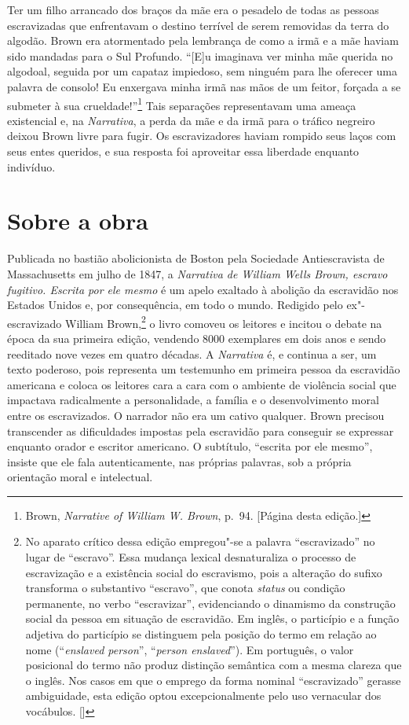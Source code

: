Ter um filho arrancado dos braços da mãe era o pesadelo de todas as
pessoas escravizadas que enfrentavam o destino terrível de serem
removidas da terra do algodão. Brown era atormentado pela lembrança de
como a irmã e a mãe haviam sido mandadas para o Sul Profundo. ``{[}E{]}u
imaginava ver minha mãe querida no algodoal, seguida por um capataz
impiedoso, sem ninguém para lhe oferecer uma palavra de consolo! Eu
enxergava minha irmã nas mãos de um feitor, forçada a se submeter à sua
crueldade!''\footnote{Brown, \emph{Narrative of William W. Brown}, p.~94.
  {[}Página \pageref{ref10} desta edição.{]}} Tais separações representavam uma
ameaça existencial e, na \emph{Narrativa}, a perda da mãe e da irmã para
o tráfico negreiro deixou Brown livre para fugir. Os escravizadores
haviam rompido seus laços com seus entes queridos, e sua resposta foi
aproveitar essa liberdade enquanto indivíduo.


\section{Sobre a obra}

Publicada no bastião abolicionista de Boston
pela Sociedade Antiescravista de Massachusetts em julho de 1847, a
\emph{Narrativa de William Wells Brown, escravo fugitivo. Escrita
por ele mesmo} é um apelo exaltado à abolição da escravidão nos Estados
Unidos e, por consequência, em todo o mundo. Redigido pelo ex"-escravizado
William Brown,\footnote{No aparato crítico dessa edição empregou"-se a palavra ``escravizado'' no lugar de ``escravo''. Essa mudança lexical desnaturaliza o processo de escravização e a existência social do escravismo, pois a alteração do sufixo transforma o substantivo ``escravo'', que conota \emph{status} ou condição permanente, no verbo ``escravizar'', evidenciando o dinamismo da construção social da pessoa em situação de escravidão. Em inglês, o particípio e a função adjetiva do particípio se distinguem pela posição do termo em relação ao nome (``\emph{enslaved person}'', ``\emph{person enslaved}''). Em português, o valor posicional do termo não produz distinção semântica com a mesma clareza que o inglês. Nos casos em que o emprego da forma nominal ``escravizado'' gerasse ambiguidade, esta edição optou excepcionalmente pelo uso vernacular dos vocábulos. []} o livro comoveu os leitores e incitou o debate na época
da sua primeira edição, vendendo 8000 exemplares em dois anos e sendo
reeditado nove vezes em quatro décadas. A \emph{Narrativa} é, e continua
a ser, um texto poderoso, pois representa um testemunho em primeira
pessoa da escravidão americana e coloca os leitores cara a cara com o
ambiente de violência social que impactava radicalmente a personalidade,
a família e o desenvolvimento moral entre os escravizados. O narrador
não era um cativo qualquer. Brown precisou transcender as dificuldades
impostas pela escravidão para conseguir se expressar enquanto orador e
escritor americano. O subtítulo, ``escrita por ele mesmo'', insiste que
ele fala autenticamente, nas próprias palavras, sob a própria orientação
moral e intelectual.

